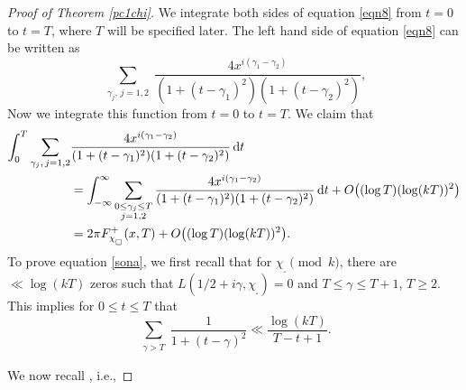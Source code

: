 \documentclass[pdflatex]{sn-jnl}%
\newcommand{\dx}{\mathrm{d}}
\theoremstyle{sltheorems}
\theoremstyle{plainrem}
\theoremstyle{definition}
\begin{document}
\begin{proof}[Proof of Theorem \ref{pc1chi}]

We integrate both sides of equation \eqref{eqn8} from $t=0$ to $t=T$,
where $T$ will be specified later.
The left hand side of equation \eqref{eqn8} can be written as 
%
\begin{equation*}
    \sum_{\substack{\gamma_j, \, j=1,2 
    }}
   \frac{4 x^{i(\gamma_1 - \gamma_2)}}{(1+(t -\gamma_1)^2) (1+(t-\gamma_2)^2)},
\end{equation*}
Now we integrate 
this function from $t=0$ to $t=T.$ We claim that
\begin{align}
\notag
    \int_{0}^T
    \sum_{\substack{ \gamma_j, \, j=1,2
    }}&
   \frac{4 x^{i(\gamma_1 - \gamma_2)}}{(1+(t -\gamma_1)^2) (1+(t-\gamma_2)^2)} \, \dx t 
   \\
\notag
    & =
    \int_{- \infty}^{\infty} 
    \sum_{\substack{  0 \le \gamma_j  \le T \\ j=1,2
     }}
   \frac{4 x^{i(\gamma_1 - \gamma_2)}}{(1+(t -\gamma_1)^2) (1+(t-\gamma_2)^2)} \, \dx t 
   + O\bigl( (\log T)(\log (kT))^2\bigr)
   \\
     \label{sona}
     &=   2\pi 
     F^+_{\chi_{_\square}}(x,T) + O\bigl( (\log T)(\log (kT))^2\bigr).
   \end{align}
To prove equation \eqref{sona}, we first recall that for $\chi_{_{\square}} \pmod{k}$, there are $\ll \log (kT)$ 
zeros such that $L(1/2 + i\gamma, \chi_{_{\square}}) = 0$ and $T \le \gamma \le T+1$, $T  \ge  2$. 
This implies for $ 0 \le t  \le T$ that
%
\begin{equation}
\label{eqn33}
    \sum_{\substack{ \gamma   >T 
    }}
   \frac{1}{1+(t - \gamma)^2 }
   \ll 
    \frac{\log (kT)}{T-t+1}.
    \end{equation}

    
We now recall \cite[Ch.~16, Lemma]{Davenport}, i.e., 


\end{proof}
\end{document}
